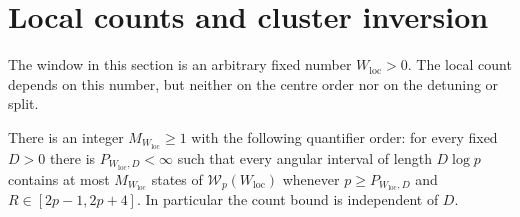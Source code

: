 \section{Local counts and cluster inversion}\label{inf:sec-localization}

The window in this section is an arbitrary fixed number
$W_{\mathrm{loc}}>0$.
The local count depends on this number, but neither on the centre
order nor on the detuning or split.

\begin{theorem}\label{inf:local-count}
There is an integer $M_{W_{\mathrm{loc}}}\ge1$ with the following
quantifier order: for every fixed $D>0$ there is
$P_{W_{\mathrm{loc}},D}<\infty$ such that every angular interval
of length $D\log p$ contains at most $M_{W_{\mathrm{loc}}}$
states of $\mathcal W_p(W_{\mathrm{loc}})$ whenever
$p\ge P_{W_{\mathrm{loc}},D}$ and $R\in[2p-1,2p+4]$.
In particular the count bound is independent of $D$.
\end{theorem}
